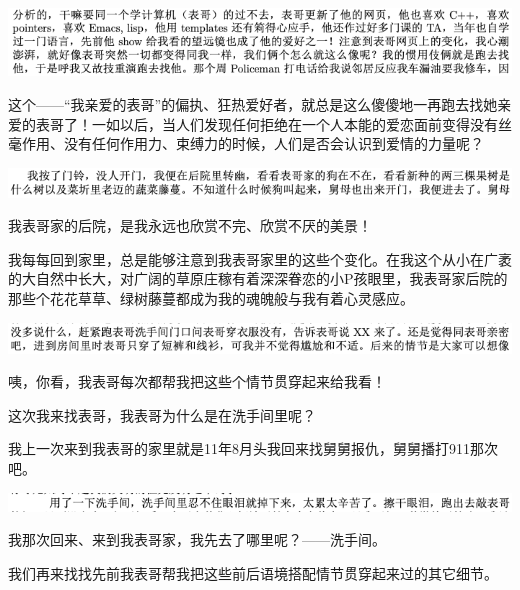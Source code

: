 \documentclass[9pt, b5paper]{article}
\begin{document}
\begin{center}
\includegraphics[width=.9\linewidth]{./pic/backups_plans_20210502_094459.png}
\end{center}

这个——“我亲爱的表哥”的偏执、狂热爱好者，就总是这么傻傻地一再跑去找她亲爱的表哥了！一如以后，当人们发现任何拒绝在一个人本能的爱恋面前变得没有丝毫作用、没有任何作用力、束缚力的时候，人们是否会认识到爱情的力量呢？

\begin{center}
\includegraphics[width=.9\linewidth]{./pic/backups_plans_20210502_094658.png}
\end{center}

我表哥家的后院，是我永远也欣赏不完、欣赏不厌的美景！

我每每回到家里，总是能够注意到我表哥家里的这些个变化。在我这个从小在广袤的大自然中长大，对广阔的草原庄稼有着深深眷恋的小P孩眼里，我表哥家后院的那些个花花草草、绿树藤蔓都成为我的魂魄般与我有着心灵感应。 

\begin{center}
\includegraphics[width=.9\linewidth]{./pic/backups_plans_20210502_094751.png}
\end{center}

咦，你看，我表哥每次都帮我把这些个情节贯穿起来给我看！

这次我来找表哥，我表哥为什么是在洗手间里呢？

我上一次来到我表哥的家里就是11年8月头我回来找舅舅报仇，舅舅播打911那次吧。

\begin{center}
\includegraphics[width=.9\linewidth]{./pic/backups_plans_20210502_105502.png}
\end{center}

我那次回来、来到我表哥家，我先去了哪里呢？——洗手间。 

我们再来找找先前我表哥帮我把这些前后语境搭配情节贯穿起来过的其它细节。
\end{document}
